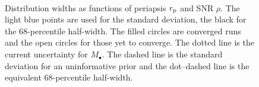 \begin{figure}
\begin{center}
 \\
 \quad
{}
\caption{Distribution widths as functions of periapsis $r_\mathrm{p}$ and SNR $\rho$. The light blue points are used for the standard deviation, the black for the $68$-percentile half-width. The filled circles are converged runs and the open circles for those yet to converge. The dotted line is the current uncertainty for $M_\bullet$. The dashed line is the standard deviation for an uninformative prior and the dot--dashed line is the equivalent $68$-percentile half-width.\label{fig:sigmas}}
\end{center}
\end{figure}
